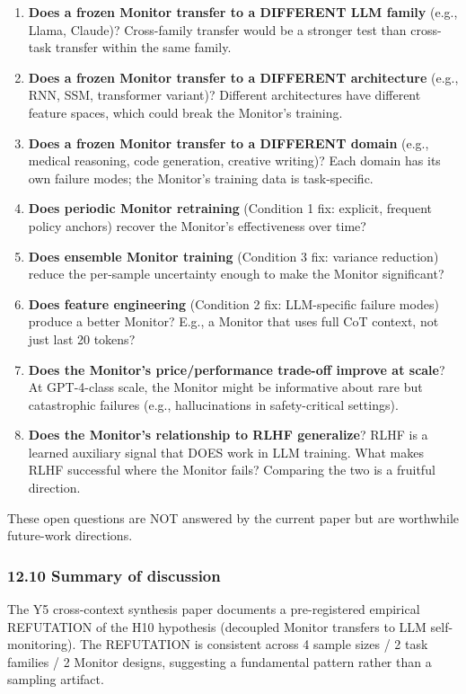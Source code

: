 \documentclass[11pt]{article}
\begin{document}
\begin{enumerate}
\def\labelenumi{\arabic{enumi}.}
\item
  \textbf{Does a frozen Monitor transfer to a DIFFERENT LLM family}
  (e.g., Llama, Claude)? Cross-family transfer would be a stronger test
  than cross-task transfer within the same family.
\item
  \textbf{Does a frozen Monitor transfer to a DIFFERENT architecture}
  (e.g., RNN, SSM, transformer variant)? Different architectures have
  different feature spaces, which could break the Monitor's training.
\item
  \textbf{Does a frozen Monitor transfer to a DIFFERENT domain} (e.g.,
  medical reasoning, code generation, creative writing)? Each domain has
  its own failure modes; the Monitor's training data is task-specific.
\item
  \textbf{Does periodic Monitor retraining} (Condition 1 fix: explicit,
  frequent policy anchors) recover the Monitor's effectiveness over
  time?
\item
  \textbf{Does ensemble Monitor training} (Condition 3 fix: variance
  reduction) reduce the per-sample uncertainty enough to make the
  Monitor significant?
\item
  \textbf{Does feature engineering} (Condition 2 fix: LLM-specific
  failure modes) produce a better Monitor? E.g., a Monitor that uses
  full CoT context, not just last 20 tokens?
\item
  \textbf{Does the Monitor's price/performance trade-off improve at
  scale}? At GPT-4-class scale, the Monitor might be informative about
  rare but catastrophic failures (e.g., hallucinations in
  safety-critical settings).
\item
  \textbf{Does the Monitor's relationship to RLHF generalize}? RLHF is a
  learned auxiliary signal that DOES work in LLM training. What makes
  RLHF successful where the Monitor fails? Comparing the two is a
  fruitful direction.
\end{enumerate}

These open questions are NOT answered by the current paper but are
worthwhile future-work directions.

\subsubsection{12.10 Summary of discussion}\label{summary-of-discussion}

The Y5 cross-context synthesis paper documents a pre-registered
empirical REFUTATION of the H10 hypothesis (decoupled Monitor transfers
to LLM self- monitoring). The REFUTATION is consistent across 4 sample
sizes / 2 task families / 2 Monitor designs, suggesting a fundamental
pattern rather than a sampling artifact.
\end{document}
